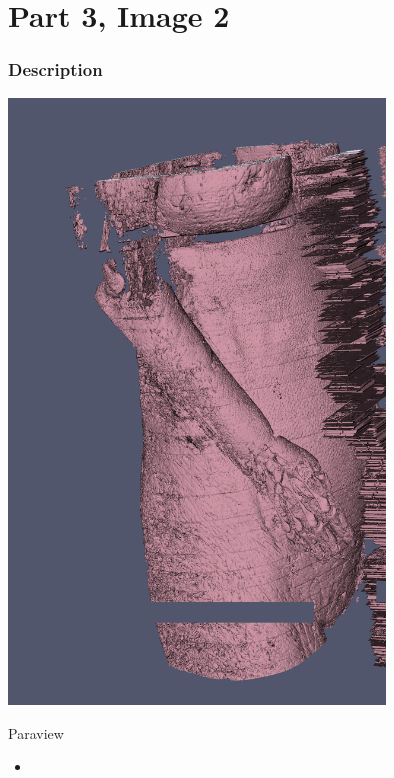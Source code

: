 \hypertarget{part-3-image-1}{%
	\section{Part 3, Image 2}\label{part-1-design-4}}


\centering


\hypertarget{description}{%
	\subsubsection{Description}\label{description}}

\begin{description}
	\item[Image:]
	\item\includegraphics[width=10cm]{Fullbody1.png}
	
	\item[Tool:]
	\hfill \break
		Paraview
	\item[Visual Mappings:]
	
	\begin{itemize}
		\tightlist
		\item[ ]
	\end{itemize}
	

\end{description}
